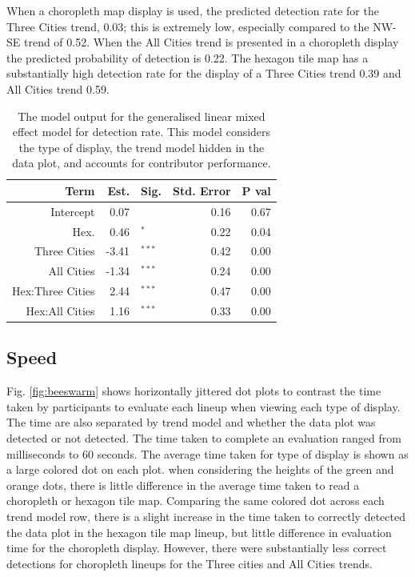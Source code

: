 \documentclass[conference,final,]{IEEEtran}
\begin{document}
When a choropleth map display is used, the predicted detection rate for the Three Cities trend, 0.03; this is extremely low, especially compared to the NW-SE trend of 0.52.
When the All Cities trend is presented in a choropleth display the predicted probability of detection is 0.22.
The hexagon tile map has a substantially high detection rate for the display of a Three Cities trend 0.39 and All Cities trend 0.59.

\begin{table}

\caption{\label{tab:detect-glmer1}The model output for the generalised linear mixed effect model for detection rate. This model considers the type of display, the trend model hidden in the data plot, and accounts for contributor performance.}
\centering
\begin{tabular}[t]{rrlrr}
\toprule
Term & Est. & Sig. & Std. Error & P val\\
\midrule
Intercept & 0.07 & $^{ }$ & 0.16 & 0.67\\
Hex. & 0.46 & $^{*}$ & 0.22 & 0.04\\
\addlinespace
Three Cities & -3.41 & $^{***}$ & 0.42 & 0.00\\
All Cities & -1.34 & $^{***}$ & 0.24 & 0.00\\
\addlinespace
Hex:Three Cities & 2.44 & $^{***}$ & 0.47 & 0.00\\
Hex:All Cities & 1.16 & $^{***}$ & 0.33 & 0.00\\
\bottomrule
\end{tabular}
\end{table}

\hypertarget{speed}{%
\subsection{Speed}\label{speed}}

Fig. \ref{fig:beeswarm} shows horizontally jittered dot plots to contrast the time taken by participants to evaluate each lineup when viewing each type of display. The time are also separated by trend model and whether the data plot was detected or not detected. The time taken to complete an evaluation ranged from milliseconds to 60 seconds. The average time taken for type of display is shown as a large colored dot on each plot. when considering the heights of the green and orange dots, there is little difference in the average time taken to read a choropleth or hexagon tile map. Comparing the same colored dot across each trend model row, there is a slight increase in the time taken to correctly detected the data plot in the hexagon tile map lineup, but little difference in evaluation time for the choropleth display. However, there were substantially less correct detections for choropleth lineups for the Three cities and All Cities trends.
\end{document}
